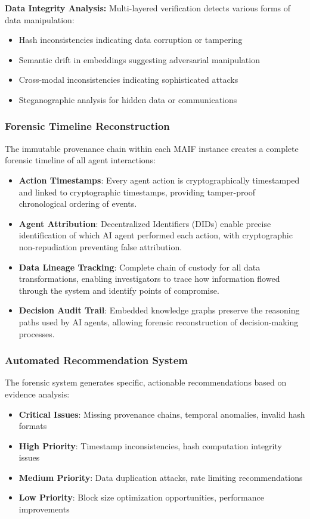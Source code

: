 \documentclass[conference]{IEEEtran}
\begin{document}
\textbf{Data Integrity Analysis:} Multi-layered verification detects various forms of data manipulation:
\begin{itemize}[leftmargin=*]
\item Hash inconsistencies indicating data corruption or tampering
\item Semantic drift in embeddings suggesting adversarial manipulation
\item Cross-modal inconsistencies indicating sophisticated attacks
\item Steganographic analysis for hidden data or communications
\end{itemize}

\subsubsection{Forensic Timeline Reconstruction}

The immutable provenance chain within each MAIF instance creates a complete forensic timeline of all agent interactions:

\begin{itemize}[leftmargin=*]
\item \textbf{Action Timestamps}: Every agent action is cryptographically timestamped and linked to cryptographic timestamps, providing tamper-proof chronological ordering of events.
\item \textbf{Agent Attribution}: Decentralized Identifiers (DIDs) enable precise identification of which AI agent performed each action, with cryptographic non-repudiation preventing false attribution.
\item \textbf{Data Lineage Tracking}: Complete chain of custody for all data transformations, enabling investigators to trace how information flowed through the system and identify points of compromise.
\item \textbf{Decision Audit Trail}: Embedded knowledge graphs preserve the reasoning paths used by AI agents, allowing forensic reconstruction of decision-making processes.
\end{itemize}

\subsubsection{Automated Recommendation System}

The forensic system generates specific, actionable recommendations based on evidence analysis:

\begin{itemize}[leftmargin=*]
\item \textbf{Critical Issues}: Missing provenance chains, temporal anomalies, invalid hash formats
\item \textbf{High Priority}: Timestamp inconsistencies, hash computation integrity issues
\item \textbf{Medium Priority}: Data duplication attacks, rate limiting recommendations
\item \textbf{Low Priority}: Block size optimization opportunities, performance improvements
\end{itemize}
\end{document}
